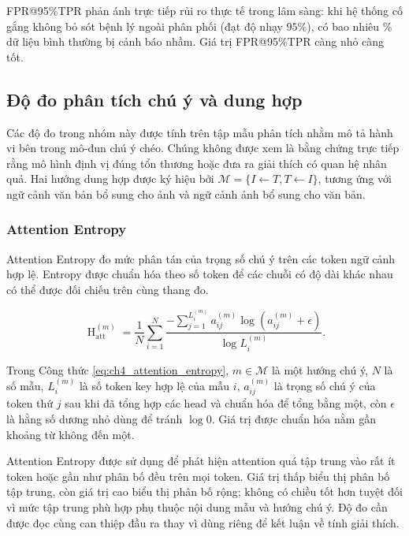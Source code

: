 FPR@95\%TPR phản ánh trực tiếp rủi ro thực tế trong lâm sàng: khi hệ thống cố gắng không bỏ sót bệnh lý ngoài phân phối (đạt độ nhạy $95\%$), có bao nhiêu \% dữ liệu bình thường bị cảnh báo nhầm. Giá trị FPR@95\%TPR càng nhỏ càng tốt.

\subsection{Độ đo phân tích chú ý và dung hợp}

Các độ đo trong nhóm này được tính trên tập mẫu phân tích nhằm mô tả hành vi bên trong mô-đun chú ý chéo. Chúng không được xem là bằng chứng trực tiếp rằng mô hình định vị đúng tổn thương hoặc đưa ra giải thích có quan hệ nhân quả. Hai hướng dung hợp được ký hiệu bởi $\mathcal{M}=\{I\leftarrow T,T\leftarrow I\}$, tương ứng với ngữ cảnh văn bản bổ sung cho ảnh và ngữ cảnh ảnh bổ sung cho văn bản.

\subsubsection{Attention Entropy}

Attention Entropy đo mức phân tán của trọng số chú ý trên các token ngữ cảnh hợp lệ. Entropy được chuẩn hóa theo số token để các chuỗi có độ dài khác nhau có thể được đối chiếu trên cùng thang đo.

\begin{equation}\operatorname{H}_{\mathrm{att}}^{(m)}=\frac{1}{N}\sum_{i=1}^{N}\frac{-\sum_{j=1}^{L_i^{(m)}}a_{ij}^{(m)}\log\left(a_{ij}^{(m)}+\epsilon\right)}{\log L_i^{(m)}}.\label{eq:ch4_attention_entropy}\end{equation}

Trong Công thức \ref{eq:ch4_attention_entropy}, $m\in\mathcal{M}$ là một hướng chú ý, $N$ là số mẫu, $L_i^{(m)}$ là số token key hợp lệ của mẫu $i$, $a_{ij}^{(m)}$ là trọng số chú ý của token thứ $j$ sau khi đã tổng hợp các head và chuẩn hóa để tổng bằng một, còn $\epsilon$ là hằng số dương nhỏ dùng để tránh $\log 0$. Giá trị được chuẩn hóa nằm gần khoảng từ không đến một.

Attention Entropy được sử dụng để phát hiện attention quá tập trung vào rất ít token hoặc gần như phân bố đều trên mọi token. Giá trị thấp biểu thị phân bố tập trung, còn giá trị cao biểu thị phân bố rộng; không có chiều tốt hơn tuyệt đối vì mức tập trung phù hợp phụ thuộc nội dung mẫu và hướng chú ý. Độ đo cần được đọc cùng can thiệp đầu ra thay vì dùng riêng để kết luận về tính giải thích.

